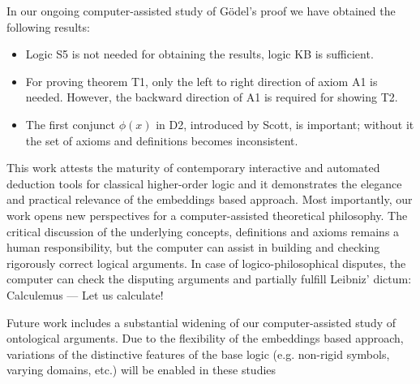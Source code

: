 \documentclass{llncs}
\begin{document}
In our ongoing computer-assisted study of G\"odel's proof we have
obtained the following results:
\begin{itemize}
\item Logic S5 is not needed for obtaining the results, logic KB is
  sufficient.
\item For proving theorem T1, only the left to right direction of
  axiom A1 is needed. However, the backward direction of A1 is
  required for showing T2.
\item The first conjunct $\phi(x)$ in D2, introduced by Scott, is important; without it the set of axioms and definitions becomes inconsistent.
\end{itemize}

This work attests the maturity of contemporary interactive and
automated deduction tools for classical higher-order logic and it
demonstrates the elegance and practical relevance of the embeddings
based approach.  Most importantly, our work opens new perspectives for
a computer-assisted theoretical philosophy.  The critical discussion
of the underlying concepts, definitions and axioms remains a human
responsibility, but the computer can assist in building and checking
rigorously correct logical arguments. In case of logico-philosophical
disputes, the computer can check the disputing arguments and partially
fulfill Leibniz' dictum: Calculemus --- Let us calculate!


Future work includes a substantial widening of our computer-assisted
study of ontological arguments. Due to the flexibility of the
embeddings based approach, variations of the distinctive features of
the base logic (e.g. non-rigid symbols, varying domains, etc.)  will
be enabled in these studies



\end{document}
